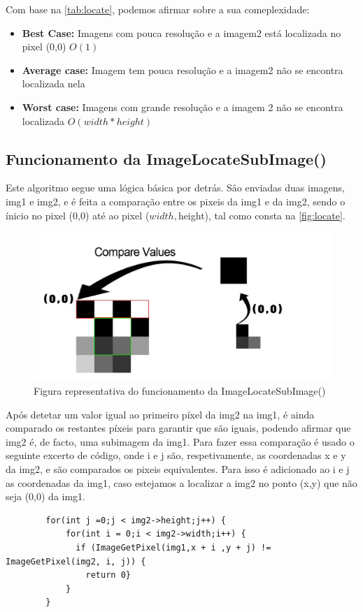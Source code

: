 \newpage 

\par Com base na \autoref{tab:locate}, podemos afirmar sobre a sua comeplexidade:
\begin{itemize}
    \item \textbf{Best Case:} Imagens com pouca resolução e a imagem2 está localizada no pixel (0,0) $O(1)$
    \item \textbf{Average case:} Imagem tem pouca resolução e a imagem2 não se encontra localizada nela
    \item \textbf{Worst case:} Imagens com grande resolução e a imagem 2 não se encontra localizada $O(width * height)$
\end{itemize}

\subsection{Funcionamento da ImageLocateSubImage()}
    \par Este algoritmo segue uma lógica básica por detrás. Sâo enviadas duas imagens, img1 e img2, e é feita 
        a comparação entre os pixeis da img1 e da img2, sendo o ínicio no pixel (0,0) até ao pixel ($width,$height),
        tal como consta na \autoref{fig:locate}.

    \begin{figure} [H]
        \centering
        \includegraphics[scale=0.25]{images/Locate_Function.pdf}
        \caption{Figura representativa do funcionamento da ImageLocateSubImage()}
        \label{fig:locate}
    \end{figure}

    \par Após detetar um valor igual ao primeiro píxel da img2 na img1, é ainda comparado os restantes píxeis para 
        garantir que são iguais, podendo afirmar que img2 é, de facto, uma subimagem da img1. Para fazer essa 
        comparação é usado o seguinte excerto de código, onde i e j são, respetivamente, as coordenadas x e y da 
        img2, e são comparados os pixeis equivalentes. Para isso é adicionado ao i e j as coordenadas da img1, caso
        estejamos a localizar a img2 no ponto (x,y) que não seja (0,0) da img1.

    \begin{lstlisting}
        for(int j =0;j < img2->height;j++) {
            for(int i = 0;i < img2->width;i++) {
              if (ImageGetPixel(img1,x + i ,y + j) != ImageGetPixel(img2, i, j)) {
                return 0}
            }
        }
    \end{lstlisting}

